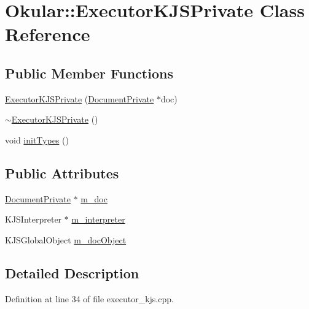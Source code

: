 \hypertarget{classOkular_1_1ExecutorKJSPrivate}{\section{Okular\+:\+:Executor\+K\+J\+S\+Private Class Reference}
\label{classOkular_1_1ExecutorKJSPrivate}
}
\subsection*{Public Member Functions}
\begin{DoxyCompactItemize}
\item 
\hyperlink{classOkular_1_1ExecutorKJSPrivate_a49e171f8f694c09075676bedf6a6ddc1}{Executor\+K\+J\+S\+Private} (\hyperlink{classOkular_1_1DocumentPrivate}{Document\+Private} $\ast$doc)
\item 
\hyperlink{classOkular_1_1ExecutorKJSPrivate_a36297513b16a329e16307cfba82e45dd}{$\sim$\+Executor\+K\+J\+S\+Private} ()
\item 
void \hyperlink{classOkular_1_1ExecutorKJSPrivate_a824a4c7eb6c91fdbbc233e1a63ef4735}{init\+Types} ()
\end{DoxyCompactItemize}
\subsection*{Public Attributes}
\begin{DoxyCompactItemize}
\item 
\hyperlink{classOkular_1_1DocumentPrivate}{Document\+Private} $\ast$ \hyperlink{classOkular_1_1ExecutorKJSPrivate_acad3df06880e02e5c64b48f40a63438c}{m\+\_\+doc}
\item 
K\+J\+S\+Interpreter $\ast$ \hyperlink{classOkular_1_1ExecutorKJSPrivate_aab3d209d83b8336b64fd8af397dff44c}{m\+\_\+interpreter}
\item 
K\+J\+S\+Global\+Object \hyperlink{classOkular_1_1ExecutorKJSPrivate_a37b97b1e212263d57d46eabf7ab21a67}{m\+\_\+doc\+Object}
\end{DoxyCompactItemize}


\subsection{Detailed Description}


Definition at line 34 of file executor\+\_\+kjs.\+cpp.



